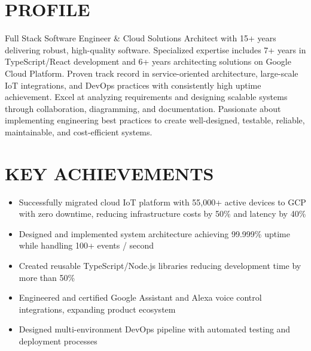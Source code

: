 \documentclass{fullstackdeveloper-ats}
\begin{document}

\vspace{0.3cm}

\section{PROFILE}
\justify
Full Stack Software Engineer \& Cloud Solutions Architect with 15+ years delivering robust, high-quality software. Specialized expertise includes 7+ years in TypeScript/React development and 6+ years architecting solutions on Google Cloud Platform. Proven track record in service-oriented architecture, large-scale IoT integrations, and DevOps practices with consistently high uptime achievement. Excel at analyzing requirements and designing scalable systems through collaboration, diagramming, and documentation. Passionate about implementing engineering best practices to create well-designed, testable, reliable, maintainable, and cost-efficient systems.

\section{KEY ACHIEVEMENTS}
\begin{itemize}
    \item Successfully migrated cloud IoT platform with 55,000+ active devices to GCP with zero downtime, reducing infrastructure costs by 50\% and latency by 40\%
    \item Designed and implemented system architecture achieving 99.999\% uptime while handling 100+ events / second
    \item Created reusable TypeScript/Node.js libraries reducing development time by more than 50\%
    \item Engineered and certified Google Assistant and Alexa voice control integrations, expanding product ecosystem
    \item Designed multi-environment DevOps pipeline with automated testing and deployment processes
\end{itemize}

\end{document}
